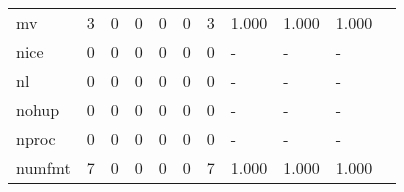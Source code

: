\begin{longtable}{lp{1.2cm}p{1.2cm}p{1.2cm}p{1.2cm}p{1.2cm}p{1.2cm}p{1.2cm}p{1.2cm}p{1.2cm}p{1.2cm}}
mv        &                                     3 &                                                  0 &                                                  0 &                                                  0 &                                                  0 &                                                  3 &                                              1.000 &                                              1.000 &                                              1.000 \\
nice      &                                     0 &                                                  0 &                                                  0 &                                                  0 &                                                  0 &                                                  0 &                                                  - &                                                  - &                                                  - \\
nl        &                                     0 &                                                  0 &                                                  0 &                                                  0 &                                                  0 &                                                  0 &                                                  - &                                                  - &                                                  - \\
nohup     &                                     0 &                                                  0 &                                                  0 &                                                  0 &                                                  0 &                                                  0 &                                                  - &                                                  - &                                                  - \\
nproc     &                                     0 &                                                  0 &                                                  0 &                                                  0 &                                                  0 &                                                  0 &                                                  - &                                                  - &                                                  - \\
numfmt    &                                     7 &                                                  0 &                                                  0 &                                                  0 &                                                  0 &                                                  7 &                                              1.000 &                                              1.000 &                                              1.000 \\

\end{longtable}
